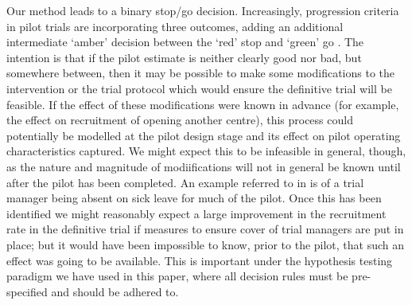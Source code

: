 \documentclass[AMA,STIX1COL]{WileyNJD-v2}
\begin{document}
Our method leads to a binary stop/go decision. Increasingly, progression criteria in pilot trials are incorporating three outcomes, adding an additional intermediate `amber' decision between the `red' stop and `green' go \cite{Avery2017}. The intention is that if the pilot estimate is neither clearly good nor bad, but somewhere between, then it may be possible to make some modifications to the intervention or the trial protocol which would ensure the definitive trial will be feasible. If the effect of these modifications were known in advance (for example, the effect on recruitment of opening another centre), this process could potentially be modelled at the pilot design stage and its effect on pilot operating characteristics captured. We might expect this to be infeasible in general, though, as the nature and magnitude of modiifications will not in general be known until after the pilot has been completed. An example referred to in \cite{Avery2017} is of a trial manager being absent on sick leave for much of the pilot. Once this has been identified we might reasonably expect a large improvement in the recruitment rate in the definitive trial if measures to ensure cover of trial managers are put in place; but it would have been impossible to know, prior to the pilot, that such an effect was going to be available. This is important under the hypothesis testing paradigm we have used in this paper, where all decision rules must be pre-specified and should be adhered to.
\end{document}
